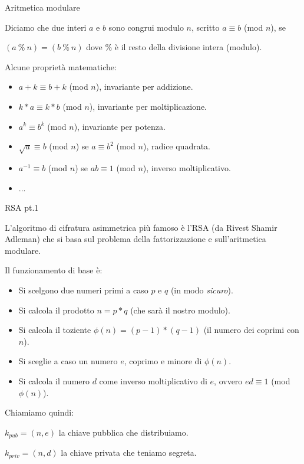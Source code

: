 \documentclass[handout, xcolor=dvipsnames,aspectratio=169]{beamer}
\begin{document}
\begin{frame}{Aritmetica modulare}

Diciamo che due interi $a$ e $b$ sono congrui modulo $n$, scritto $a \equiv b$ (mod $n$), se

$(a\ \%\ n) = (b\ \%\ n)$ dove \% è il resto della divisione intera (modulo).

\medskip

\pause

Alcune proprietà matematiche:

\pause

\begin{itemize}
  \item $a + k\equiv b + k$ (mod $n$), invariante per addizione.
  \item $k*a \equiv k*b$ (mod $n$), invariante per moltiplicazione.
  \item $a^k \equiv b^k$ (mod $n$), invariante per potenza.\pause
  \item $\sqrt{a} \equiv b$ (mod $n$) se $a \equiv b^2$ (mod $n$), radice quadrata.
  \item $a^{-1} \equiv b$ (mod $n$) se $ab \equiv 1$ (mod $n$), inverso moltiplicativo.
  \item ...
\end{itemize}

\end{frame}

\begin{frame}{RSA pt.1}

\pause

L'algoritmo di cifratura asimmetrica più famoso è l'RSA (da {\color{red}R}ivest {\color{red}S}hamir {\color{red}A}dleman) che si basa sul problema della fattorizzazione e sull'aritmetica modulare.

\pause

\smallskip

Il funzionamento di base è:\pause

\begin{itemize}
  \item Si scelgono due numeri primi a caso $p$ e $q$ (in modo \textit{sicuro}).\pause
  \item Si calcola il prodotto $n = p*q$ (che sarà il nostro modulo).\pause
  \item Si calcola il toziente $\phi(n) = (p-1)*(q-1)$ (il numero dei coprimi con $n$).\pause
  \item Si sceglie a caso un numero $e$, coprimo e minore di $\phi(n)$.\pause
  \item Si calcola il numero $d$ come inverso moltiplicativo di $e$, ovvero $ed \equiv 1$ (mod $\phi(n)$).
\end{itemize}

\medskip

\pause

Chiamiamo quindi:

\pause

$k_{pub} = (n, e)$ la chiave pubblica che distribuiamo.

\pause

$k_{priv} = (n, d)$ la chiave privata che teniamo segreta.

\end{frame}
\end{document}
